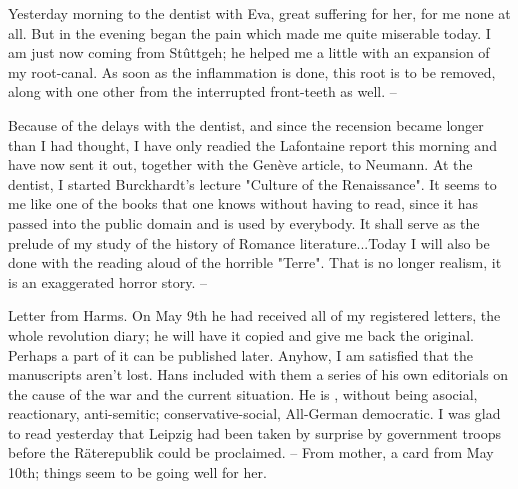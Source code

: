 
Yesterday morning to the dentist with Eva, great suffering for her, for me none at all. But in the evening began the pain which made me quite miserable today. I am just now coming from Stûttgeh; he helped me a little with an expansion of my root-canal. As soon as the inflammation is done, this root is to be removed, along with one other from the interrupted front-teeth as well. --

Because of the delays with the dentist, and since the recension became longer than I had thought, I have only readied the Lafontaine report this morning and have now sent it out, together with the Genève article, to Neumann. At the dentist, I started Burckhardt's lecture "Culture of the Renaissance". It seems to me like one of the books that one knows without having to read, since it has passed into the public domain and is used by everybody. It shall serve as the prelude of my study of the history of Romance literature...Today I will also be done with the reading aloud of the horrible "Terre". That is no longer realism, it is an exaggerated horror story. --

Letter from Harms. On May 9th he had received all of my registered letters, the whole revolution diary; he will have it copied and give me back the original. Perhaps a part of it can be published later. Anyhow, I am satisfied that the manuscripts aren't lost. Hans included with them a series of his own editorials on the cause of the war and the current situation. He is , without being asocial, reactionary, anti-semitic; conservative-social, All-German democratic. I was glad to read yesterday that Leipzig had been taken by surprise by government troops before the Räterepublik could be proclaimed. -- From mother, a card from May 10th; things seem to be going well for her.

\missing

